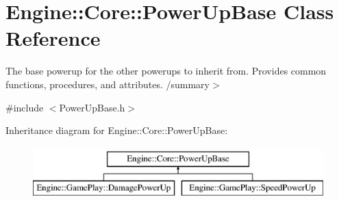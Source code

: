 \hypertarget{class_engine_1_1_core_1_1_power_up_base}{}\section{Engine\+:\+:Core\+:\+:Power\+Up\+Base Class Reference}
\label{class_engine_1_1_core_1_1_power_up_base}


The base powerup for the other powerups to inherit from. Provides common functions, procedures, and attributes. /summary$>$  




{\ttfamily \#include $<$Power\+Up\+Base.\+h$>$}

Inheritance diagram for Engine\+:\+:Core\+:\+:Power\+Up\+Base\+:\begin{figure}[H]
\begin{center}
\leavevmode
\includegraphics[height=2.000000cm]{class_engine_1_1_core_1_1_power_up_base}
\end{center}
\end{figure}
